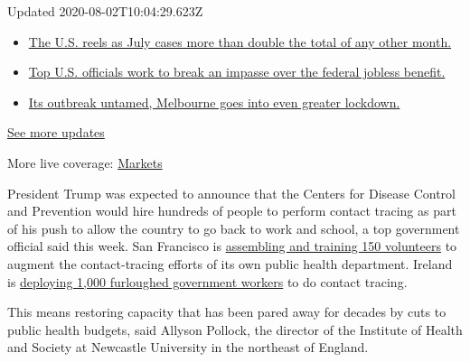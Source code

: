 Updated 2020-08-02T10:04:29.623Z

\begin{itemize}
\tightlist
\item
  \href{https://www.nytimes.com/2020/08/01/world/coronavirus-covid-19.html?action=click\&pgtype=Article\&state=default\&region=MAIN_CONTENT_1\&context=storylines_live_updates\#link-34047410}{The
  U.S. reels as July cases more than double the total of any other
  month.}
\item
  \href{https://www.nytimes.com/2020/08/01/world/coronavirus-covid-19.html?action=click\&pgtype=Article\&state=default\&region=MAIN_CONTENT_1\&context=storylines_live_updates\#link-780ec966}{Top
  U.S. officials work to break an impasse over the federal jobless
  benefit.}
\item
  \href{https://www.nytimes.com/2020/08/01/world/coronavirus-covid-19.html?action=click\&pgtype=Article\&state=default\&region=MAIN_CONTENT_1\&context=storylines_live_updates\#link-2bc8948}{Its
  outbreak untamed, Melbourne goes into even greater lockdown.}
\end{itemize}

\href{https://www.nytimes.com/2020/08/01/world/coronavirus-covid-19.html?action=click\&pgtype=Article\&state=default\&region=MAIN_CONTENT_1\&context=storylines_live_updates}{See
more updates}

More live coverage:
\href{https://www.nytimes.com/live/2020/07/31/business/stock-market-today-coronavirus?action=click\&pgtype=Article\&state=default\&region=MAIN_CONTENT_1\&context=storylines_live_updates}{Markets}

President Trump was expected to announce that the Centers for Disease
Control and Prevention would hire hundreds of people to perform contact
tracing as part of his push to allow the country to go back to work and
school, a top government official said this week. San Francisco is
\href{https://abc7news.com/san-francisco-contact-tracing-coronavirus-tracnig-bay-area-lockdown-shelter-in-place/6090943/}{assembling
and training 150 volunteers} to augment the contact-tracing efforts of
its own public health department. Ireland is
\href{https://www.irishtimes.com/news/health/large-number-of-public-service-staff-to-be-redeployed-to-contact-tracing-1.4212937}{deploying
1,000 furloughed government workers} to do contact tracing.

This means restoring capacity that has been pared away for decades by
cuts to public health budgets, said Allyson Pollock, the director of the
Institute of Health and Society at Newcastle University in the northeast
of England.

